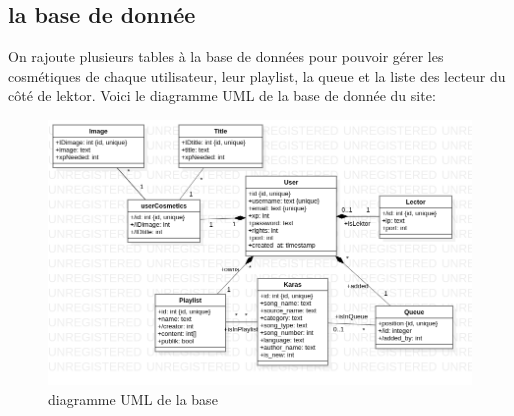 \subsection{la base de donnée}
On rajoute plusieurs tables à la base de données pour pouvoir gérer les cosmétiques de chaque utilisateur, leur playlist, la queue et la liste des lecteur du côté de lektor. Voici le diagramme UML de la base de donnée du site:
\newline
\begin{figure}[h!]
\centering
\hspace*{-1.2in}
\includegraphics[scale=0.6]{UML.png}
\caption{diagramme UML de la base}
\label{fig:diagramme UML}
\end{figure}
\newpage

